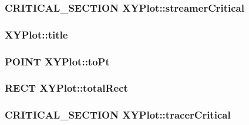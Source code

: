 \hypertarget{class_x_y_plot_ae2f69590c458b38c6f022fd10ca93f35}{
\subsubsection[{streamer\-Critical}]{\setlength{\rightskip}{0pt plus 5cm}C\-R\-I\-T\-I\-C\-A\-L\-\_\-\-S\-E\-C\-T\-I\-O\-N X\-Y\-Plot\-::streamer\-Critical\hspace{0.3cm}{\ttfamily [protected]}}}\label{class_x_y_plot_ae2f69590c458b38c6f022fd10ca93f35}
\hypertarget{class_x_y_plot_ae9f6dcfa882433683585a55edbc2d6fb}{
\subsubsection[{title}]{ X\-Y\-Plot\-::title\hspace{0.3cm}{\ttfamily [protected]}}}\label{class_x_y_plot_ae9f6dcfa882433683585a55edbc2d6fb}
\hypertarget{class_x_y_plot_a8d036a0039ee0ef215f0861a90203898}{
\subsubsection[{to\-Pt}]{\setlength{\rightskip}{0pt plus 5cm}P\-O\-I\-N\-T X\-Y\-Plot\-::to\-Pt\hspace{0.3cm}{\ttfamily [protected]}}}\label{class_x_y_plot_a8d036a0039ee0ef215f0861a90203898}
\hypertarget{class_x_y_plot_a1dcef0bb2b4cd2dc20bedbf4d1304e80}{
\subsubsection[{total\-Rect}]{\setlength{\rightskip}{0pt plus 5cm}R\-E\-C\-T X\-Y\-Plot\-::total\-Rect\hspace{0.3cm}{\ttfamily [protected]}}}\label{class_x_y_plot_a1dcef0bb2b4cd2dc20bedbf4d1304e80}
\hypertarget{class_x_y_plot_a8fd6c272f57a472a9c21a6d19ed21f7f}{
\subsubsection[{tracer\-Critical}]{\setlength{\rightskip}{0pt plus 5cm}C\-R\-I\-T\-I\-C\-A\-L\-\_\-\-S\-E\-C\-T\-I\-O\-N X\-Y\-Plot\-::tracer\-Critical\hspace{0.3cm}{\ttfamily [protected]}}}\label{class_x_y_plot_a8fd6c272f57a472a9c21a6d19ed21f7f}
